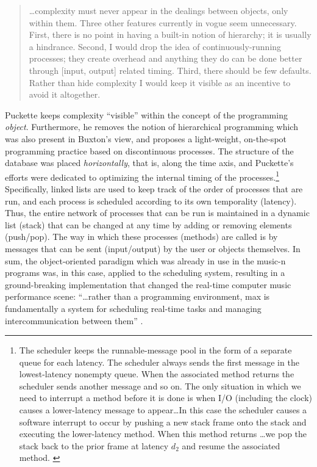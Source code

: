 	\begin{quote}
		\dots complexity must never appear in the dealings between objects, only within them. Three other features currently in vogue seem unnecessary. First, there is no point in having a built-in notion of hierarchy; it is usually a hindrance. Second, I would drop the idea of continuously-running processes; they create overhead and anything they do can be done better through [input, output] related timing. Third, there should be few defaults. Rather than hide complexity I would keep it visible as an incentive to avoid it altogether. \parencite[43]{DBLP:conf/icmc/Puckette86}
	\end{quote}

	Puckette keeps complexity ``visible'' within the concept of the programming \textit{object}. Furthermore, he removes the notion of hierarchical programming which was also present in Buxton's view, and proposes a light-weight, on-the-spot programming practice based on discontinuous processes. The structure of the database was placed \textit{horizontally}, that is, along the time axis, and Puckette's efforts were dedicated to optimizing the internal timing of the processes.\footnote{The scheduler keeps the runnable-message pool in the form of a separate queue for each latency. The scheduler always sends the first message in the lowest-latency nonempty queue. When the associated method returns the scheduler sends another message and so on. The only situation in which we need to interrupt a method before it is done is when I/O (including the clock) causes a lower-latency message to appear\dots In this case the scheduler causes a software interrupt to occur by pushing a new stack frame onto the stack and executing the lower-latency method. When this method returns \dots we pop the stack back to the prior frame at latency \(d_2\) and resume the associated method. \parencite[46]{DBLP:conf/icmc/Puckette86}} Specifically, linked lists are used to keep track of the order of processes that are run, and each process is scheduled according to its own temporality (latency). Thus, the entire network of processes that can be run is maintained in a dynamic list (stack) that can be changed at any time by adding or removing elements (push/pop). The way in which these processes (methods) are called is by messages that can be sent (input/output) by the user or objects themselves. In sum, the object-oriented paradigm which was already in use in the \gls{music-n} programs was, in this case, applied to the scheduling system, resulting in a ground-breaking implementation that changed the real-time computer music performance scene: ``\dots rather than a programming environment, \gls{max} is fundamentally a system for scheduling real-time tasks and managing intercommunication between them'' \parencite{DBLP:journals/comj/Puckette02}.

